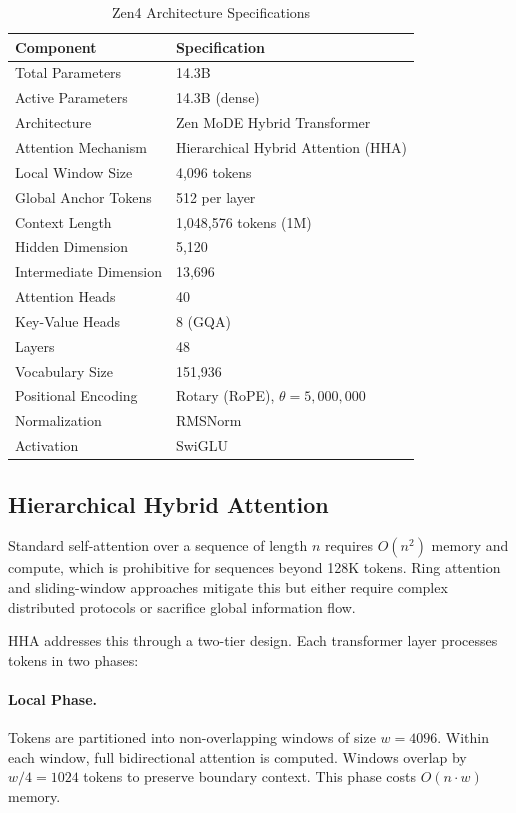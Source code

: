 \documentclass[11pt,a4paper]{article}
\begin{document}
\begin{table}[H]
\centering
\begin{tabular}{ll}
\toprule
\textbf{Component} & \textbf{Specification} \\
\midrule
Total Parameters       & 14.3B \\
Active Parameters      & 14.3B (dense) \\
Architecture           & Zen MoDE Hybrid Transformer \\
Attention Mechanism    & Hierarchical Hybrid Attention (HHA) \\
Local Window Size      & 4,096 tokens \\
Global Anchor Tokens   & 512 per layer \\
Context Length         & 1,048,576 tokens (1M) \\
Hidden Dimension       & 5,120 \\
Intermediate Dimension & 13,696 \\
Attention Heads        & 40 \\
Key-Value Heads        & 8 (GQA) \\
Layers                 & 48 \\
Vocabulary Size        & 151,936 \\
Positional Encoding    & Rotary (RoPE), $\theta = 5{,}000{,}000$ \\
Normalization          & RMSNorm \\
Activation             & SwiGLU \\
\bottomrule
\end{tabular}
\caption{Zen4 Architecture Specifications}
\end{table}

\subsection{Hierarchical Hybrid Attention}

Standard self-attention over a sequence of length $n$ requires $O(n^2)$ memory and compute, which
is prohibitive for sequences beyond 128K tokens. Ring attention and sliding-window approaches
mitigate this but either require complex distributed protocols or sacrifice global information flow.

HHA addresses this through a two-tier design. Each transformer layer processes tokens in two phases:

\paragraph{Local Phase.} Tokens are partitioned into non-overlapping windows of size $w = 4096$.
Within each window, full bidirectional attention is computed. Windows overlap by $w/4 = 1024$ tokens
to preserve boundary context. This phase costs $O(n \cdot w)$ memory.
\end{document}
